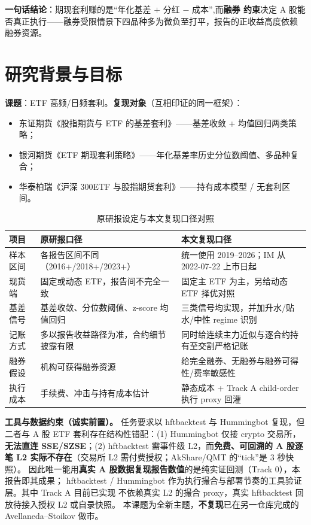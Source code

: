 \documentclass[11pt]{ctexart}
\begin{document}
\noindent\textbf{一句话结论}：期现套利赚的是``年化基差 $+$ 分红 $-$ 成本'',而\textbf{融券
约束}决定 A 股能否真正执行——融券受限情景下四品种多为微负至打平，报告的正收益高度依赖
融券资源。

\section{研究背景与目标}

\textbf{课题}：ETF 高频/日频套利。\textbf{复现对象}（互相印证的同一框架）：

\begin{itemize}\setlength\itemsep{1pt}
  \item 东证期货《股指期货与 ETF 的基差套利》——基差收敛 + 均值回归两类策略；
  \item 银河期货《ETF 期现套利策略》——年化基差率历史分位数阈值、多品种复合；
  \item 华泰柏瑞《沪深 300ETF 与股指期货套利》——持有成本模型 / 无套利区间。
\end{itemize}

\begin{table}[h]\centering\small
\caption{原研报设定与本文复现口径对照}\label{tab:params}
\begin{tabular}{>{\raggedright\arraybackslash}p{2.6cm}
                >{\raggedright\arraybackslash}p{4.1cm}
                >{\raggedright\arraybackslash}p{5.6cm}}
\toprule
项目 & 原研报口径 & 本文复现口径 \\
\midrule
样本区间 & 各报告区间不同（2016+/2018+/2023+） & 统一使用 2019--2026；IM 从 2022-07-22 上市日起 \\
现货端 & 固定或动态 ETF，报告间不完全一致 & 固定主 ETF 为主，另给动态 ETF 择优对照 \\
基差信号 & 基差收敛、分位数阈值、z-score 均值回归 & 三类信号均实现，并加升水/贴水/中性 regime 识别 \\
记账方式 & 多以报告收益路径为准，合约细节披露有限 & 同时给连续主力近似与逐合约持有至交割严格记账 \\
融券假设 & 机构可获得融券资源 & 给完全融券、无融券与融券可得性/费率敏感性 \\
执行成本 & 手续费、冲击与持有成本估计 & 静态成本 + Track A child-order 执行 proxy 回灌 \\
\bottomrule
\end{tabular}
\end{table}

\noindent\textbf{工具与数据约束（诚实前置）。} 任务要求以 hftbacktest 与 Hummingbot
复现，但二者与 A 股 ETF 套利存在结构性错配：(1) Hummingbot 仅接 crypto 交易所，
\textbf{无法直连 SSE/SZSE}；(2) hftbacktest 需事件级 L2，而\textbf{免费、可回溯的
A 股逐笔 L2 实际不存在}（交易所 L2 需付费授权；AkShare/QMT 的``tick''是 3 秒快照）。
因此唯一能用\textbf{真实 A 股数据复现报告数值}的是纯实证回测（Track 0），本报告即其成果；
hftbacktest / Hummingbot 作为执行撮合与部署节奏的工具验证层。其中 Track A 目前已实现
不依赖真实 L2 的撮合 proxy，真实 hftbacktest 回放待接入授权 L2 或自录快照。
本课题为全新主题，\textbf{不复现}已在另一仓库完成的 Avellaneda--Stoikov 做市。
\end{document}
